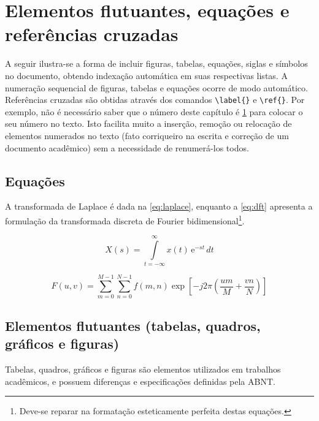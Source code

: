 %
%

\chapter{Elementos flutuantes, equações e referências cruzadas}
\label{chap:ef}

A seguir ilustra-se a forma de incluir figuras, tabelas, equações, siglas e 
símbolos no documento, obtendo indexação automática em suas respectivas
                listas.
A numeração sequencial de figuras, tabelas e equações ocorre de modo automático.
Referências cruzadas são obtidas através dos comandos \verb#\label{}# e \verb#\ref{}#.
Por exemplo, não é necessário saber que o número deste capítulo é \ref{chap:ef} para colocar o seu número no texto.
Isto facilita muito a inserção, remoção ou relocação de elementos numerados no texto (fato corriqueiro na escrita e correção de um documento acadêmico) sem a necessidade de renumerá-los todos.





 
\section{Equações}
\label{sec:equacoes}

A transformada de Laplace é dada na \autoref{eq:laplace}, enquanto a \autoref{eq:dft} apresenta a formulação da transformada discreta de Fourier bidimensional\footnote{Deve-se reparar na formatação esteticamente perfeita destas equações.}.


\begin{equation}
    X(s) = \int\limits_{t = -\infty}^{\infty} x(t) \, \text{e}^{-st} \, dt
    \label{eq:laplace}
\end{equation}

\begin{equation}
    F(u, v) = \sum_{m = 0}^{M - 1} \sum_{n = 0}^{N - 1} f(m, n) \exp \left[ -j 2 \pi \left( \frac{u m}{M} + \frac{v n}{N} \right) \right]
    \label{eq:dft}
\end{equation}


\section{Elementos flutuantes (tabelas, quadros, gráficos e figuras)}

Tabelas, quadros, gráficos e figuras são elementos utilizados em trabalhos acadêmicos, e possuem diferenças e especificações definidas pela ABNT.

